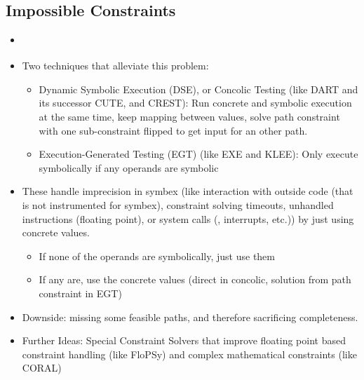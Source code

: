 \documentclass{article}
\begin{document}
\begin{multicols}{2}
    \subsection{Impossible Constraints}
    \begin{itemize}
        \item {}\cite{ReviewThreeDecades}
        \item Two techniques that alleviate this problem:
              \begin{itemize}
                  \item Dynamic Symbolic Execution (DSE), or Concolic Testing (like DART\cite{DART} and its successor CUTE\cite{CUTE}, and CREST\cite{CREST}): Run concrete and symbolic execution at the same time, keep mapping between values, solve path constraint with one sub-constraint flipped to get input for an other path. \cite{PreliminaryAssessment}
                  \item Execution-Generated Testing (EGT)\cite{EGT} (like EXE\cite{EXE} and KLEE\cite{KLEE}): Only execute symbolically if any operands are symbolic
              \end{itemize}
        \item These handle imprecision in symbex (like interaction with outside code (that is not instrumented for symbex), constraint solving timeouts, unhandled instructions (floating point), or system calls (, interrupts, etc.)) by just using concrete values.
              \begin{itemize}
                  \item If none of the operands are symbolically, just use them
                  \item If any are, use the concrete values (direct in concolic, solution from path constraint in EGT)
              \end{itemize}
        \item Downside: missing some feasible paths, and therefore sacrificing completeness.
        \item Further Ideas: Special Constraint Solvers that improve floating point based constraint handling (like FloPSy\cite{FloPSy}) and complex mathematical constraints (like CORAL\cite{CORAL})
    \end{itemize}


\end{multicols}
\end{document}
